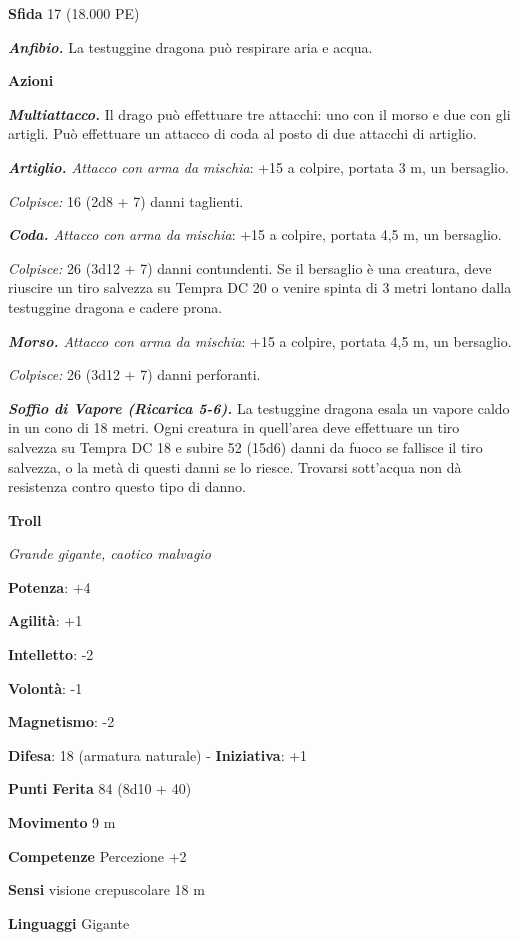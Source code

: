 \begin{multicols}{2}
\textbf{Sfida} 17 (18.000 PE)\smallskip

\emph{\textbf{Anfibio.}} La testuggine dragona può respirare aria e
acqua.

\smallskip\textbf{Azioni}

\emph{\textbf{Multiattacco.}} Il drago può effettuare tre attacchi: uno
con il morso e due con gli artigli. Può effettuare un attacco di coda al
posto di due attacchi di artiglio.

\emph{\textbf{Artiglio.} Attacco con arma da mischia}: +15 a colpire,
portata 3 m, un bersaglio.

\emph{Colpisce:} 16 (2d8 + 7) danni taglienti.

\emph{\textbf{Coda.} Attacco con arma da mischia}: +15 a colpire,
portata 4,5 m, un bersaglio.

\emph{Colpisce:} 26 (3d12 + 7) danni contundenti. Se il bersaglio è una
creatura, deve riuscire un tiro salvezza su Tempra DC 20 o venire spinta
di 3 metri lontano dalla testuggine dragona e cadere prona.

\emph{\textbf{Morso.} Attacco con arma da mischia}: +15 a colpire,
portata 4,5 m, un bersaglio.

\emph{Colpisce:} 26 (3d12 + 7) danni perforanti.

\emph{\textbf{Soffio di Vapore (Ricarica 5-6).}} La testuggine dragona
esala un vapore caldo in un cono di 18 metri. Ogni creatura in
quell'area deve effettuare un tiro salvezza su Tempra DC 18 e
subire 52 (15d6) danni da fuoco se fallisce il tiro salvezza, o la metà
di questi danni se lo riesce. Trovarsi sott'acqua non dà resistenza
contro questo tipo di danno.

\textbf{Troll}

\emph{Grande gigante, caotico malvagio}

\textbf{Potenza}: +4

\textbf{Agilità}: +1

\textbf{Intelletto}: -2

\textbf{Volontà}: -1

\textbf{Magnetismo}: -2

\textbf{Difesa}: 18 (armatura naturale) - \textbf{Iniziativa}: +1

\textbf{Punti Ferita} 84 (8d10 + 40)

\textbf{Movimento} 9 m

\textbf{Competenze} Percezione +2

\textbf{Sensi} visione crepuscolare 18 m

\textbf{Linguaggi} Gigante


\end{multicols}
